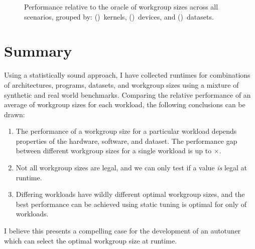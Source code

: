 \begin{figure}

\caption{%
  Performance relative to the oracle of workgroup sizes across all
  scenarios, grouped by: ()~kernels,
  ()~devices, and
  ()~datasets.%
}
\label{fig:performances}
\end{figure}


\section{Summary}

Using a statistically sound approach, I have collected runtimes for
 combinations of architectures, programs,
datasets, and workgroup sizes using a mixture of synthetic and real
world benchmarks. Comparing the relative performance of an average of
 workgroup sizes for each workload, the
following conclusions can be drawn:

\begin{enumerate}
\item The performance of a workgroup size for a particular workload
  depends properties of the hardware, software, and dataset. The
  performance gap between different workgroup sizes for a single
  workload is up to $\times$.
\item Not all workgroup sizes are legal, and we can only test if a
  value \emph{is} legal at runtime.
\item Differing workloads have wildly different optimal workgroup
  sizes, and the best performance can be achieved using static tuning
  is optimal for only  of
  workloads.
\end{enumerate}

I believe this presents a compelling case for the development of an
autotuner which can select the optimal workgroup size at runtime.
